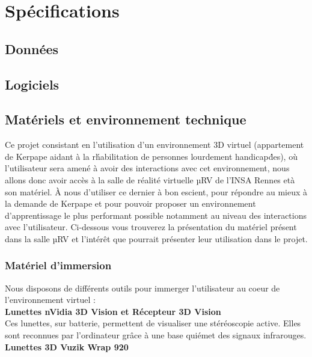 \section{Sp\'ecifications}

\subsection{Donn\'ees}


\subsection{Logiciels}


\subsection{Mat\'eriels et environnement technique}

Ce projet consistant en l'utilisation d'un environnement 3D virtuel (appartement de Kerpape aidant \`a la r\'habilitation de personnes lourdement handicap\'des), o\`u l'utilisateur sera amen\'e \`a avoir des interactions avec cet environnement, nous allons donc avoir acc\`es \`a la salle de r\'ealit\'e virtuelle µRV de l'INSA Rennes et\`a son mat\'eriel. \`A nous d'utiliser ce dernier \`a bon escient, pour r\'epondre au mieux \`a la demande de Kerpape et pour pouvoir proposer un environnement d'apprentissage le plus performant possible notamment au niveau des interactions avec l'utilisateur. 
Ci-dessous vous trouverez la pr\'esentation du mat\'eriel pr\'esent dans la salle µRV et l'int\'er\^et que pourrait pr\'esenter leur utilisation dans le projet.

\subsubsection{Mat\'eriel d'immersion}
Nous disposons de diff\'erents outils pour immerger l'utilisateur au coeur de l'environnement virtuel : 
\\

\textbf{Lunettes nVidia 3D Vision et R\'ecepteur 3D Vision}
\\

Ces lunettes, sur batterie, permettent de visualiser une st\'er\'eoscopie active. Elles sont reconnues par l'ordinateur gr\^ace \`a une base qui\'emet des signaux infrarouges.
\\

\textbf{Lunettes 3D Vuzik Wrap 920}
\\

